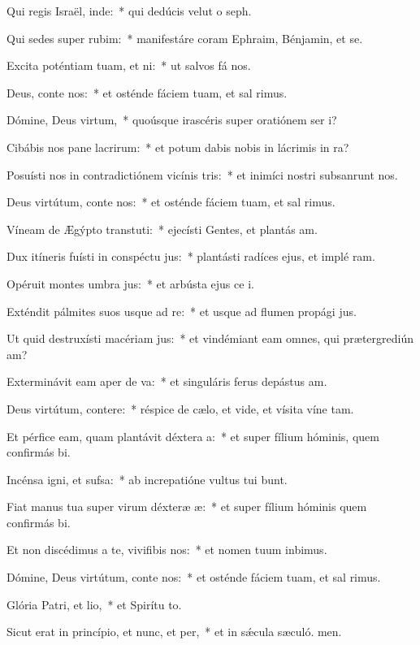 \item Qui regis Israël, inde:~* qui dedúcis velut o seph.
\item Qui sedes super rubim:~* manifestáre coram Ephraim, Bénjamin, et se.
\item Excita poténtiam tuam, et ni:~* ut salvos fá nos.
\item Deus, conte nos:~* et osténde fáciem tuam, et sal rimus.
\item Dómine, Deus virtum,~* quoúsque irascéris super oratiónem ser i?
\item Cibábis nos pane lacrirum:~* et potum dabis nobis in lácrimis in ra?
\item Posuísti nos in contradictiónem vicínis tris:~* et inimíci nostri subsanrunt nos.
\item Deus virtútum, conte nos:~* et osténde fáciem tuam, et sal rimus.
\item Víneam de Ægýpto transtuti:~* ejecísti Gentes, et plantás am.
\item Dux itíneris fuísti in conspéctu jus:~* plantásti radíces ejus, et implé ram.
\item Opéruit montes umbra jus:~* et arbústa ejus ce i.
\item Exténdit pálmites suos usque ad re:~* et usque ad flumen propági jus.
\item Ut quid destruxísti macériam jus:~* et vindémiant eam omnes, qui prætergrediún am?
\item Exterminávit eam aper de va:~* et singuláris ferus depástus  am.
\item Deus virtútum, contere:~* réspice de cælo, et vide, et vísita víne tam.
\item Et pérfice eam, quam plantávit déxtera a:~* et super fílium hóminis, quem confirmás bi.
\item Incénsa igni, et sufsa:~* ab increpatióne vultus tui bunt.
\item Fiat manus tua super virum déxteræ æ:~* et super fílium hóminis quem confirmás bi.
\item Et non discédimus a te, vivifibis nos:~* et nomen tuum inbimus.
\item Dómine, Deus virtútum, conte nos:~* et osténde fáciem tuam, et sal rimus.
\item Glória Patri, et lio,~* et Spirítu to.
\item Sicut erat in princípio, et nunc, et per,~* et in sǽcula sæculó. men.

